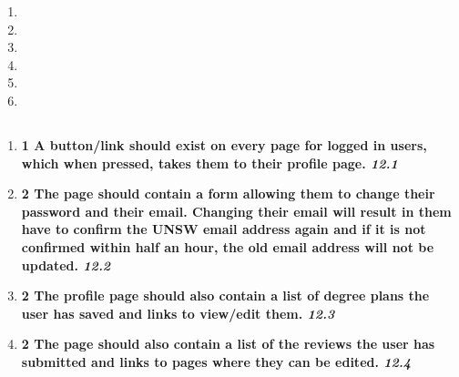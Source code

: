 \documentclass[12pt,titlepage]{article}
\newenvironment{storyPoint}
   {\color{blue} \bfseries}
   {}
\newenvironment{storyId}
   {\color{Bittersweet} \itshape}
   {}
\begin{document}
\begin{enumerate}
   \item \storyElevenPointOne{}
   \item \storyElevenPointTwo{}
   \item \storyElevenPointThree{}
   \item \storyElevenPointFour{}
   \item \storyElevenPointFive{}
   \item \storyElevenPointSix{}
\end{enumerate}

\subsection{\epicTwelve{}}

\newcommand{\storyTwelvePointOne}{
   \begin{storyPoint}1\end{storyPoint}
   A button/link should exist on every page for logged in users, which when
   pressed, takes them to their profile page.
   \begin{storyId}12.1\end{storyId}
}
\newcommand{\storyTwelvePointTwo}{
   \begin{storyPoint}2\end{storyPoint}
   The page should contain a form allowing them to change their password and
   their email. Changing their email will result in them have to confirm the
   UNSW email address again and if it is not confirmed within half an hour, the
   old email address will not be updated.
   \begin{storyId}12.2\end{storyId}
}
\newcommand{\storyTwelvePointThree}{
   \begin{storyPoint}2\end{storyPoint}
   The profile page should also contain a list of degree plans the user has
   saved and links to view/edit them. 
   \begin{storyId}12.3\end{storyId}
}
\newcommand{\storyTwelvePointFour}{
   \begin{storyPoint}2\end{storyPoint}
   The page should also contain a list of the reviews the user has submitted and
   links to pages where they can be edited.
   \begin{storyId}12.4\end{storyId}
}

\begin{enumerate}
   \item \storyTwelvePointOne{}
   \item \storyTwelvePointTwo{}
   \item \storyTwelvePointThree{}
   \item \storyTwelvePointFour{}
\end{enumerate}
\end{document}
